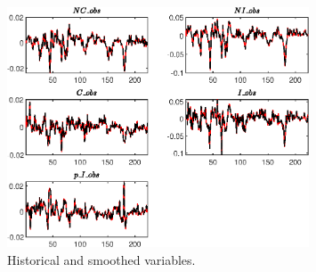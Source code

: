  
\begin{figure}[H]
\centering 
\includegraphics[width=0.80\textwidth]{BRS_sectoral_KK/graphs/BRS_sectoral_KK_HistoricalAndSmoothedVariables1}
\caption{Historical and smoothed variables.}\label{Fig:HistoricalAndSmoothedVariables:1}
\end{figure}


